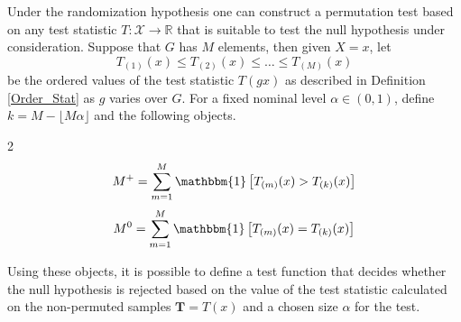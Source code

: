 \documentclass[12pt, a4paper]{article}
\theoremstyle{MAstyle} \newtheorem{assumption}{Assumption}[section]
\theoremstyle{MAstyle} \newtheorem{definition}{Definition}[section]
\theoremstyle{MAstyle} \newtheorem{theorem}{Theorem}[section]
\begin{document}
			Under the randomization hypothesis one can construct a permutation test based on any test statistic $T:\mathcal{X} \rightarrow \mathbb{R}$ that is suitable to test the null hypothesis under consideration. Suppose that $G$ has $M$ elements, then given $X = x$, let 
			$$T_{(1)}(x) \leq T_{(2)}(x) \leq \dots \leq T_{(M)}(x) $$
			be the ordered values of the test statistic $T(gx)$ as described in Definition \ref{Order_Stat} as $g$ varies over $G$. For a fixed nominal level $\alpha \in (0,1)$, define $k = M - \lfloor M\alpha \rfloor$ and the following objects.
			\begin{multicols}{2}
				\noindent
				\begin{equation*}
					M^{+} = \sum_{m = 1}^{M}\mathbbm{1}\left[T_{(m)}(x) > T_{(k)}(x)\right]
				\end{equation*}
				\begin{equation}
					M^{0} = \sum_{m = 1}^{M}\mathbbm{1}\left[T_{(m)}(x) = T_{(k)}(x)\right]
				\end{equation}
			\end{multicols}
			
			Using these objects, it is possible to define a test function that decides whether the null hypothesis is rejected based on the value of the test statistic calculated on the non-permuted samples $\textbf{T} = T(x)$ and a chosen size $\alpha$ for the test.
			
\end{document}
